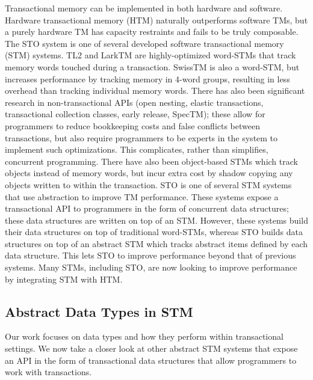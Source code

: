 Transactional memory can be implemented in both hardware and software. Hardware transactional memory (HTM) naturally outperforms software TMs, but a purely hardware TM has capacity restraints and fails to be truly composable\cite{htm}. The STO system\cite{sto} is one of several developed software transactional memory (STM) systems. TL2\cite{tl2} and LarkTM\cite{larktm} are highly-optimized word-STMs that track memory words touched during a transaction. SwissTM\cite{swisstm} is also a word-STM, but increases performance by tracking memory in 4-word groups, resulting in less overhead than tracking individual memory words. There has also been significant research in non-transactional APIs (open nesting\cite{opennesting}, elastic transactions\cite{elastic}, transactional collection classes\cite{tcc}, early release\cite{earlyrelease}, SpecTM\cite{spectm}); these allow for programmers to reduce bookkeeping costs and false conflicts between transactions, but also require programmers to be experts in the system to implement such optimizations. This complicates, rather than simplifies, concurrent programming. There have also been object-based STMs which track objects instead of memory words, but incur extra cost by shadow copying any objects written to within the transaction. STO is one of several STM systems that use abstraction to improve TM performance\cite{boost}\cite{optboost}\cite{autolock}\cite{predication}. These systems expose a transactional API to programmers in the form of concurrent data structures; these data structures are written on top of an STM. However, these systems build their data structures on top of traditional word-STMs, whereas STO builds data structures on top of an abstract STM which tracks abstract items defined by each data structure. This lets STO to improve performance beyond that of previous systems. Many STMs, including STO, are now looking to improve performance by integrating STM with HTM.

\subsection{Abstract Data Types in STM}
Our work focuses on data types and how they perform within transactional settings. We now take a closer look at other abstract STM systems that expose an API in the form of transactional data structures that allow programmers to work with transactions.

